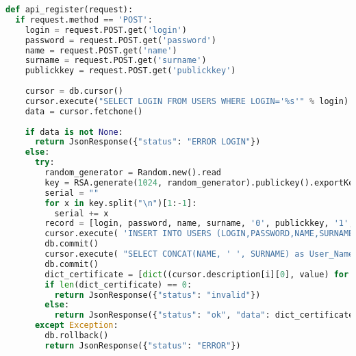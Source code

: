 \documentclass[twoside,10pt]{article}
\begin{document}
{\footnotesize
\begin{lstlisting}[caption={API rejestracji}, label={lst:serwer register}, language=Python]
def api_register(request):
  if request.method == 'POST':
    login = request.POST.get('login')
    password = request.POST.get('password')
    name = request.POST.get('name')
    surname = request.POST.get('surname')
    publickkey = request.POST.get('publickkey')
    
    cursor = db.cursor()
    cursor.execute("SELECT LOGIN FROM USERS WHERE LOGIN='%s'" % login)
    data = cursor.fetchone()
    
    if data is not None:
      return JsonResponse({"status": "ERROR LOGIN"})
    else:
      try:
        random_generator = Random.new().read
        key = RSA.generate(1024, random_generator).publickey().exportKey()
        serial = ""
        for x in key.split("\n")[1:-1]:
          serial += x
        record = [login, password, name, surname, '0', publickkey, '1', serial, datetime.now().replace(year=datetime.now().year + 1)]
        cursor.execute( 'INSERT INTO USERS (LOGIN,PASSWORD,NAME,SURNAME,IS_ADMIN,PUBLIC_KEY, ISACTIVATED, Serial_number, Validitiy_period) VALUES(%s,%s,%s,%s,%s,%s,%s,%s,%s)', record)
        db.commit()
        cursor.execute( "SELECT CONCAT(NAME, ' ', SURNAME) as User_Name, LOGIN as Issuer_name,  PUBLIC_KEY, Serial_number, Validitiy_period, Version, Signature_Algorithm_Identifier, Hash_Algorithm FROM `users` WHERE `LOGIN` = '%s'" % (login))
        db.commit()
        dict_certificate = [dict((cursor.description[i][0], value) for i, value in enumerate(row)) for row in cursor.fetchall()]
        if len(dict_certificate) == 0:
          return JsonResponse({"status": "invalid"})
        else:
          return JsonResponse({"status": "ok", "data": dict_certificate})
      except Exception:
        db.rollback()
        return JsonResponse({"status": "ERROR"})
\end{lstlisting}}
\newpage
\end{document}
